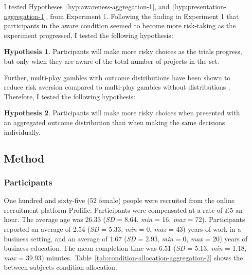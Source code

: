 \documentclass[a4paper, nobind, dvipsnames]{templates/ociamthesis}
\theoremstyle{definition}
\theoremstyle{definition}
\theoremstyle{definition}
\theoremstyle{definition}
\newtheorem{hypothesis}{Hypothesis}[chapter]
\theoremstyle{remark}
\begin{document}
I tested Hypotheses~\ref{hyp:awareness-aggregation-1},
and~\ref{hyp:presentation-aggregation-1}, from Experiment 1. Following the
finding in Experiment 1 that participants in the aware condition seemed to
become more risk-taking as the experiment progressed, I tested the following
hypothesis:

\begin{hypothesis}
\protect\hypertarget{hyp:awareness-trials-aggregation-2}{}{\label{hyp:awareness-trials-aggregation-2} }Participants will make more risky choices as the trials progress, but only when
they are aware of the total number of projects in the set.
\end{hypothesis}

Further, multi-play gambles with outcome distributions have been shown to reduce
risk aversion compared to multi-play gambles without distributions \autocites[e.g.,][]{redelmeier1992,webb2017}. Therefore, I tested the following hypothesis:

\begin{hypothesis}
\protect\hypertarget{hyp:distribution-aggregation-2}{}{\label{hyp:distribution-aggregation-2} }Participants will make more risky choices when presented with an aggregated
outcome distribution than when making the same decisions individually.
\end{hypothesis}

\subsection{Method}

\subsubsection{Participants}

One hundred and sixty-five (52 female) people were recruited from the online recruitment platform Prolific. Participants were compensated at a rate of £5 an hour. The average age was 26.33 (\emph{SD} = 8.64, \emph{min} = 16, \emph{max} = 72). Participants reported an average of 2.54 (\emph{SD} = 5.33, \emph{min} = 0, \emph{max} = 43) years of work in a business setting, and an average of 1.67 (\emph{SD} = 2.93, \emph{min} = 0, \emph{max} = 20) years of business education. The mean completion time was 6.51 (\emph{SD} = 5.13, \emph{min} = 1.18, \emph{max} = 39.93) minutes.~Table~\ref{tab:condition-allocation-aggregation-2}
shows the between-subjects condition allocation.
\end{document}
